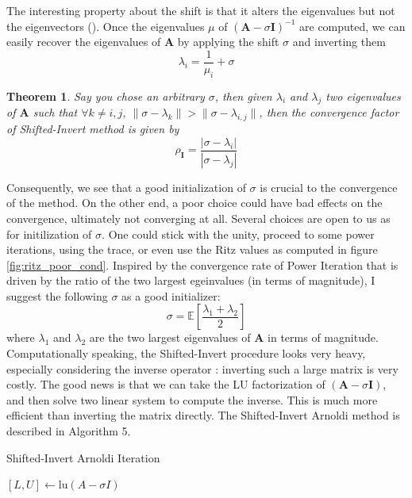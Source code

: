 \documentclass[11pt]{article}
\newtheorem{theorem}{Theorem}[section]
\numberwithin{equation}{section}
\begin{document}
The interesting property about the shift is that it alters the eigenvalues but not the eigenvectors (\cite{saad2011numerical}). Once the eigenvalues $\mu$ of $(\mathbf{A}-\sigma\mathbf{I})^{-1}$ are computed, we can easily recover the eigenvalues of $\mathbf{A}$ by applying the shift $\sigma$ and inverting them
\begin{equation*}
    \lambda_i = \frac{1}{\mu_i} + \sigma
\end{equation*}
\begin{theorem}
    Say you chose an arbitrary $\sigma$, then given $\lambda_i$ and $\lambda_j$ two eigenvalues of $\mathbf{A}$ such that $\forall k \neq i,j$, $\|\sigma-\lambda_k\| > \|\sigma-\lambda_{i,j}\|$, then the convergence factor of Shifted-Invert method is given by 
    \begin{equation}
        \rho_{\mathbf{I}} = \frac{|\sigma-\lambda_i|}{|\sigma-\lambda_j|}
    \end{equation}
\end{theorem}
Consequently, we see that a good initialization of $\sigma$ is crucial to the convergence of the method. On the other end, a poor choice could have bad effects on the convergence, ultimately not converging at all. Several choices are open to us as for initilization of $\sigma$. One could stick with the unity, proceed to some power iterations, using the trace, or even use the Ritz values as computed in figure \ref{fig:ritz_poor_cond}. Inspired by the convergence rate of Power Iteration that is driven by the ratio of the two largest egeinvalues (in terms of magnitude), I suggest the following $\sigma$ as a good initializer:
\begin{equation}
    \sigma = \mathbb{E}\left[\frac{\lambda_1+\lambda_2}{2}\right]
\end{equation}
where $\lambda_1$ and $\lambda_2$ are the two largest eigenvalues of $\mathbf{A}$ in terms of magnitude. Computationally speaking, the Shifted-Invert procedure looks very heavy, especially considering the inverse operator : inverting such a large matrix is very costly. The good news is that we can take the LU factorization of $(\mathbf{A}-\sigma\mathbf{I})$, and then solve two linear system to compute the inverse. This is much more efficient than inverting the matrix directly. The Shifted-Invert Arnoldi method is described in Algorithm 5.
\begin{algorithm2e}
    \SetAlgoLined
    \caption{Shifted-Invert Arnoldi Iteration}
    $[L,U] \gets \text{lu}(A-\sigma I)$\;
\end{algorithm2e}
\end{document}
